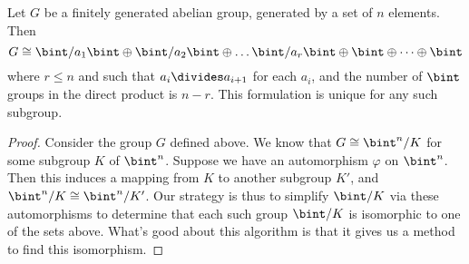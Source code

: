 \begin{theorem}
    Let $G$ be a finitely generated abelian group, generated by a set of $n$ elements. Then
    \[ G \cong \bint/a_1\bint \oplus \bint/a_2\bint \oplus \dots \bint/a_r\bint \oplus \bint \oplus \dots \oplus \bint \]
    where $r \leq n$ and such that $a_i \divides a_{i+1}$ for each $a_i$, and the number of $\bint$ groups in the direct product is $n - r$. This formulation is unique for any such subgroup.
\end{theorem}
\begin{proof}
    Consider the group $G$ defined above. We know that $G \cong \bint^n/K$ for some subgroup $K$ of $\bint^n$. Suppose we have an automorphism $\varphi$ on $\bint^n$. Then this induces a mapping from $K$ to another subgroup $K'$, and $\bint^n/K \cong \bint^n/K'$. Our strategy is thus to simplify $\bint/K$ via these automorphisms to determine that each such group $\bint/K$ is isomorphic to one of the sets above. What's good about this algorithm is that it gives us a method to find this isomorphism.


\end{proof}
